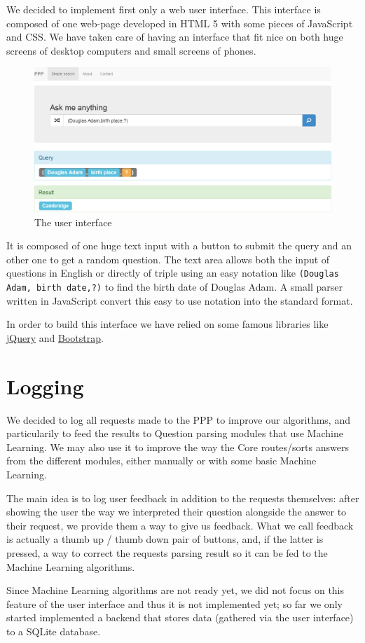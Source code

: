 We decided to implement first only a web user interface. This interface
is composed of one web-page developed in HTML 5 with some
pieces of JavaScript and CSS. We have taken care of having an
interface that fit nice on both huge screens of desktop computers
and small screens of phones.

\begin{figure}[!ht]
    \centering
    \includegraphics[scale=0.35]{WebUI.png}
    \caption{The user interface}
\end{figure}

It is composed of one huge text input with a button to submit
the query and an other one to get a random question. The text area
allows both the input of questions in English or directly of triple using
an easy notation like \texttt{(Douglas Adam, birth date,?)} to find the
birth date of Douglas Adam. A small parser written in JavaScript convert
this easy to use notation into the standard format.

In order to build this interface we have relied on some famous libraries 
like \href{http://jquery.com/}{jQuery} and \href{http://getbootstrap.com/}{Bootstrap}.

\section{Logging}

We decided to log all requests made to the PPP to improve our algorithms,
and particularily to feed the results to Question parsing
modules that use Machine Learning.
We may also use it to improve the way the Core routes/sorts answers
from the different modules, either manually or with some basic
Machine Learning.

The main idea is to log user feedback in addition to the requests
themselves: after showing the user the way we interpreted their
question alongside the answer to their request, we provide them a
way to give us feedback.
What we call feedback is actually a thumb up / thumb down pair of
buttons, and, if the latter is pressed, a way to correct the requests
parsing result so it can be fed to the Machine Learning algorithms.

Since Machine Learning algorithms are not ready yet, we did not focus
on this feature of the user interface and thus it is not implemented yet;
so far we only started implemented a backend that stores data
(gathered via the user interface) to a SQLite database.
